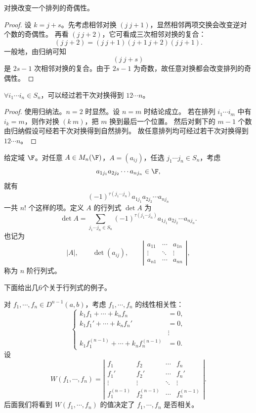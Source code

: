 \begin{lemma}\label{3.6.4}
	对换改变一个排列的奇偶性。
\end{lemma}

\begin{proof}
	设 $k=j+s$。先考虑相邻对换 $(j\ j+1)$，显然相邻两项交换会改变逆对个数的奇偶性。
	再看 $(j\ j+2)$，它可看成三次相邻对换的复合：
	\[
	(j\ j+2)=(j\ j+1)(j+1\ j+2)(j\ j+1).
	\]
	一般地，由归纳可知
	\[
	(j\ j+s)
	\]
	是 $2s-1$ 次相邻对换的复合。由于 $2s-1$ 为奇数，故任意对换都会改变排列的奇偶性。
\end{proof}

\begin{lemma}\label{3.6.5}
	$\forall i_1\cdots i_n\in S_n$，可以经过若干次对换得到 $12\cdots n$。
\end{lemma}

\begin{proof}
	使用归纳法。$n=2$ 时显然。设 $n=m$ 时结论成立。
	若在排列 $i_1\cdots i_m$ 中有 $i_k=m$，则作对换 $(k\ m)$，把 $m$ 换到最后一个位置。
	然后对剩下的 $m-1$ 个数由归纳假设可经若干次对换得到自然排列。
	故任意排列均可经过若干次对换得到 $12\cdots n$。
\end{proof}

\begin{definition}\label{3.6.6}\label{p1:concept:c3-l1908}
	给定域 $\F$。对任意 $A\in M_n(\F)$，$A=(a_{ij})$，任选 $j_1\cdots j_n\in S_n$，考虑
	\[
	a_{1j_1}a_{2j_2}\cdots a_{nj_n}\in\F,
	\]
	就有
	\[
	(-1)^{\tau(j_1\cdots j_n)}a_{1j_1}a_{2j_2}\cdots a_{nj_n}
	\]
	一共 $n!$ 个这样的项。定义 $A$ 的行列式 $\det A$ 为
	\[
	\det A=
	\sum_{j_1\cdots j_n\in S_n}
	(-1)^{\tau(j_1\cdots j_n)}a_{1j_1}a_{2j_2}\cdots a_{nj_n}.
	\]
	也记为
	\[
	|A|,
	\qquad
	\det(a_{ij}),
	\qquad
	\left|
	\begin{matrix}
		a_{11}&\cdots&a_{1n}\\
		\vdots&\ddots&\vdots\\
		a_{n1}&\cdots&a_{nn}
	\end{matrix}
	\right|,
	\]
	称为 $n$ 阶行列式。
\end{definition}

下面给出几6个关于行列式的例子。

\begin{example}
	对 $f_1,\cdots,f_n\in D^{n-1}(a,b)$，考虑 $f_1,\cdots,f_n$ 的线性相关性：
	\[
	\left\{
	\begin{aligned}
		k_1f_1+\cdots+k_nf_n&=0,\\
		k_1f_1'+\cdots+k_nf_n'&=0,\\
		&\vdots\\
		k_1f_1^{(n-1)}+\cdots+k_nf_n^{(n-1)}&=0.
	\end{aligned}
	\right.
	\]
	设
	\[
	W(f_1,\cdots,f_n)=
	\left|
	\begin{matrix}
		f_1&f_2&\cdots&f_n\\
		f_1'&f_2'&\cdots&f_n'\\
		\vdots&\vdots&\ddots&\vdots\\
		f_1^{(n-1)}&f_2^{(n-1)}&\cdots&f_n^{(n-1)}
	\end{matrix}
	\right|.
	\]
	后面我们将看到 $W(f_1,\cdots,f_n)$ 的值决定了 $f_1,\cdots,f_n$ 是否相关。
\end{example}


